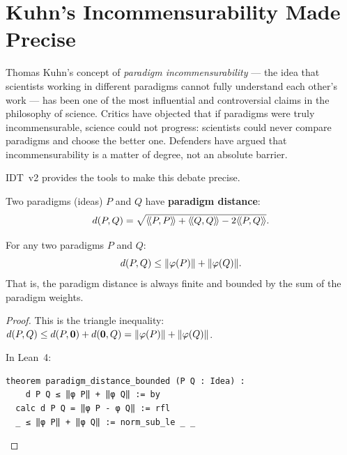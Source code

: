 \section{Kuhn's Incommensurability Made Precise}

Thomas Kuhn's concept of \emph{paradigm incommensurability} --- the idea that
scientists working in different paradigms cannot fully understand each other's
work --- has been one of the most influential and controversial claims in the
philosophy of science. Critics have objected that if paradigms were truly
incommensurable, science could not progress: scientists could never compare
paradigms and choose the better one. Defenders have argued that
incommensurability is a matter of degree, not an absolute barrier.

IDT~v2 provides the tools to make this debate precise.

\begin{definition}
\label{def:paradigm-distance}
Two paradigms (ideas) $P$ and $Q$ have \textbf{paradigm distance}:
\[
  d(P, Q) = \sqrt{\langle\!\langle P, P \rangle\!\rangle + \langle\!\langle Q, Q \rangle\!\rangle - 2\langle\!\langle P, Q \rangle\!\rangle}.
\]
\end{definition}

\begin{theorem}
\label{thm:incommensurability-finite}
For any two paradigms $P$ and $Q$:
\[
  d(P, Q) \leq \lVert \varphi(P) \rVert + \lVert \varphi(Q) \rVert.
\]
That is, the paradigm distance is always finite and bounded by the sum of the
paradigm weights.
\end{theorem}

\begin{proof}
This is the triangle inequality: $d(P, Q) \leq d(P, \mathbf{0}) + d(\mathbf{0}, Q) =
\lVert \varphi(P) \rVert + \lVert \varphi(Q) \rVert$.

In Lean~4:
\begin{lstlisting}
theorem paradigm_distance_bounded (P Q : Idea) :
    d P Q ≤ ‖φ P‖ + ‖φ Q‖ := by
  calc d P Q = ‖φ P - φ Q‖ := rfl
  _ ≤ ‖φ P‖ + ‖φ Q‖ := norm_sub_le _ _
\end{lstlisting}
\end{proof}

